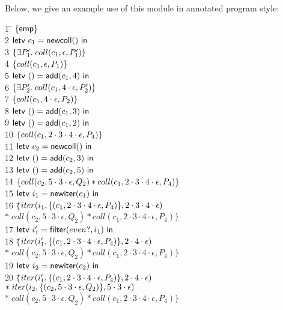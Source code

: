 \documentclass[preprint,natbib]{sigplanconf}
\begin{document}
Below, we give an example use of this module in annotated program
style: {\small
\begin{tabbing}
1 \qquad \= $\{{\mathsf{emp}}\}$ \\
2 \> $\mbox{\textsf{{letv }}}c_1 = \mbox{\textsf{{newcoll}}}()\mbox{\textsf{{ in }}}$ \\
3 \> $\{{\exists P'_1.\; coll(c_1, \epsilon, P'_1)}\}$ \\
4 \> $\{{coll(c_1, \epsilon, P_1)}\}$ \\
5 \> $\mbox{\textsf{{letv }}}() = \mbox{\textsf{{add}}}(c_1, 4)\mbox{\textsf{{ in }}}$ \\
6 \> $\{{\exists P'_2.\; coll(c_1, 4\cdot\epsilon, P'_2)}\}$ \\
7 \> $\{{coll(c_1, 4\cdot\epsilon, P_2)}\}$ \\
8 \> $\mbox{\textsf{{letv }}}() = \mbox{\textsf{{add}}}(c_1, 3)\mbox{\textsf{{ in }}}$ \\
9 \> $\mbox{\textsf{{letv }}}() = \mbox{\textsf{{add}}}(c_1, 2)\mbox{\textsf{{ in }}}$ \\
10 \> $\{{coll(c_1, 2\cdot3\cdot4\cdot\epsilon, P_4)}\}$ \\
11 \> $\mbox{\textsf{{letv }}}c_2 = \mbox{\textsf{{newcoll}}}()\mbox{\textsf{{ in }}}$ \\
12 \> $\mbox{\textsf{{letv }}}() = \mbox{\textsf{{add}}}(c_2, 3)\mbox{\textsf{{ in }}}$ \\
13 \> $\mbox{\textsf{{letv }}}() = \mbox{\textsf{{add}}}(c_2, 5)\mbox{\textsf{{ in }}}$ \\
14\> $\{{coll(c_2, 5\cdot3\cdot\epsilon, Q_2) * coll(c_1, 2\cdot3\cdot4\cdot\epsilon, P_4)}\}$ \\
15\> $\mbox{\textsf{{letv }}}i_1 = \mbox{\textsf{{newiter}}}(c_1)\mbox{\textsf{{ in }}}$ \\
16\> $\{$\=$iter(i_1, \{{(c_1, 2\cdot3\cdot4\cdot\epsilon, P_4)}\}, 2\cdot3\cdot4\cdot\epsilon)$
\\ 
  \>\>$*\; coll(c_2, 5\cdot3\cdot\epsilon, Q_2) * coll(c_1, 2\cdot3\cdot4\cdot\epsilon, P_4)\}$ \\
17 \> $\mbox{\textsf{{letv }}}i'_1 = \mbox{\textsf{{filter}}}(even?, i_1)\mbox{\textsf{{ in }}}$ \\
18 \> $\{$\=$iter(i'_1, \{{(c_1, 2\cdot3\cdot4\cdot\epsilon, P_4)}\}, 2\cdot4\cdot\epsilon)$ \\
   \>\>$*\; coll(c_2, 5\cdot3\cdot\epsilon, Q_2) * coll(c_1, 2\cdot3\cdot4\cdot\epsilon, P_4)\}$\\
19 \> $\mbox{\textsf{{letv }}}i_2 = \mbox{\textsf{{newiter}}}(c_2)\mbox{\textsf{{ in }}}$ \\
20 \> $\{$\=$iter(i'_1, \{{(c_1, 2\cdot3\cdot4\cdot\epsilon, P_4)}\}, 2\cdot4\cdot\epsilon)$\\
  \>\>$*\;iter(i_2, \{{(c_2, 5\cdot3\cdot\epsilon, Q_2)}\}, 5\cdot3\cdot\epsilon)$ \\
  \>\>$*\;coll(c_2, 5\cdot3\cdot\epsilon, Q_2) * coll(c_1, 2\cdot3\cdot4\cdot\epsilon, P_4)\}$ \\

\end{tabbing}}
\end{document}
